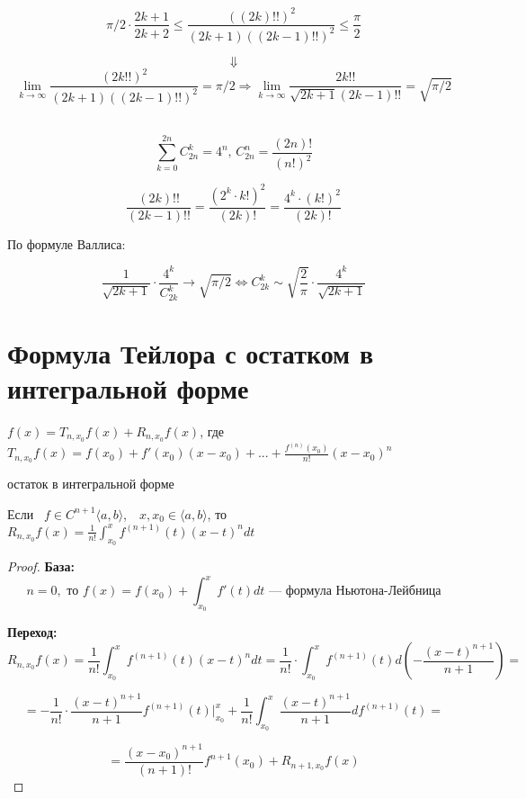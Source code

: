 \begin{example}
\[
    \pi / 2 \cdot \frac{2k + 1}{2k + 2} \leqslant \frac{((2k)!!)^2}{(2k + 1)((2k - 1)!!) ^ 2} \leqslant \frac{\pi}{2}
\]

\[
    \Downarrow
\]
\[
    \lim_{k \to \infty} \frac{(2k!!)^2}{(2k + 1)((2k - 1)!!) ^ 2} = \pi / 2 \Rightarrow  \lim_{k \to \infty} \frac{2k!!}{\sqrt{2k + 1}(2k - 1)!!} = \sqrt{\pi / 2}
\]
\\

\follow 

\[
    \sum_{k = 0}^{2n} C_{2n}^{k} = 4 ^ n, \,
    C_{2n}^n = \frac{(2n)!}{(n!)^2}
\]

\[
    \frac{(2k)!!}{(2k - 1)!!} = \frac{(2^k \cdot k!)^2}{(2k)!} = \frac{4 ^ k \cdot (k!)^2}{(2k)!}
\]

По формуле Валлиса:

\[
    \frac{1}{\sqrt{2k + 1}} \cdot \frac{4 ^ k}{C_{2k}^k} \to \sqrt{\pi / 2} \Leftrightarrow C_{2k}^k \sim \sqrt{\frac{2}{\pi}} \cdot \frac{4 ^ k}{\sqrt{2k + 1}}
\]

\end{example}



\newpage

\section{Формула Тейлора с остатком в интегральной форме}

\quad

$f(x) = T_{n, x_0} f(x) + R_{n, x_0} f(x)$, где $T_{n, x_0} f(x) = f(x_0) + f'(x_0)(x - x_0) + ... + \frac{f^{(n)}(x_0)}{n!}(x - x_0)^n$

\begin{namedtheorem}{остаток в интегральной форме}
    
    Если \, $f \in C^{n + 1} \langle a, b \rangle$,  \,\, $x, x_0 \in \langle a, b \rangle$, то $
        R_{n, x_0}f(x) = \frac{1}{n!} \int_{x_0}^x f^{(n + 1)}(t)(x-t)^n dt
    $
\end{namedtheorem}

\begin{proof}

    \textbf{\large База:} 
    \[
        n = 0, \text{ то } f(x) = f(x_0) + \int_{x_0}^{x}f'(t)dt  \text{ --- формула Ньютона-Лейбница}
    \]

    \textbf{\large Переход:} 
    \[
        R_{n, x_0}f(x) = \frac{1}{n!} \int_{x_0}^{x}f^{(n+1)}(t)(x - t)^n dt = \frac{1}{n!} \cdot \int_{x_0}^x f^{(n + 1)}(t) d(-\frac{(x - t) ^ {n + 1}}{n + 1}) = 
    \]

    \[
        = - \frac{1}{n!} \cdot \frac{(x - t) ^ {n + 1}}{n + 1} f^{(n + 1)}(t) \bigg|_{x_0}^{x} + \frac{1}{n!} \int_{x_0}^{x} \frac{(x - t)^{n + 1}}{n + 1} d f^{(n + 1)}(t) = 
    \]

    \[
        = \frac{(x - x_0) ^ {n + 1}}{(n + 1)!} f^{n + 1}(x_0) + R_{n + 1, x_0} f(x)
    \]


\end{proof}


